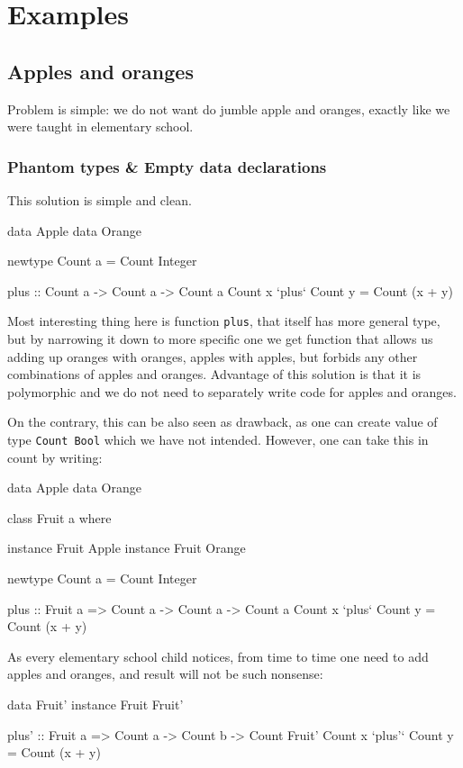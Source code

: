 \documentclass[11pt,oneside,draft]{fithesis2}
\begin{document}
\chapter{Examples}

\section{Apples and oranges}

Problem is simple: we do not want do jumble apple and oranges,
exactly like we were taught in elementary school.

\subsection{Phantom types \& Empty data declarations}

This solution is simple and clean.
\begin{code}
data Apple
data Orange

newtype Count a = Count Integer

plus :: Count a -> Count a -> Count a
Count x `plus` Count y = Count (x + y)
\end{code}
Most interesting thing here is function \texttt{plus}, that itself has more general type, but
by narrowing it down to more specific one we get function that allows us
adding up oranges with oranges, apples with apples, but forbids any other combinations
of apples and oranges. Advantage of this solution is that it is polymorphic
and we do not need to separately write code for apples and oranges.

On the contrary, this can be also seen as drawback, as one can create value
of type \texttt{Count Bool} which we have not intended. However,
one can take this in count by writing:
\begin{code}
data Apple
data Orange

class Fruit a where

instance Fruit Apple
instance Fruit Orange

newtype Count a = Count Integer

plus :: Fruit a => Count a -> Count a -> Count a
Count x `plus` Count y = Count (x + y)
\end{code}

As every elementary school child notices, from time to time one need to add apples and oranges,
and result will not be such nonsense:
\begin{code}
data Fruit'
instance Fruit Fruit'

plus' :: Fruit a => Count a -> Count b -> Count Fruit'
Count x `plus'` Count y = Count (x + y)
\end{code}
\end{document}
